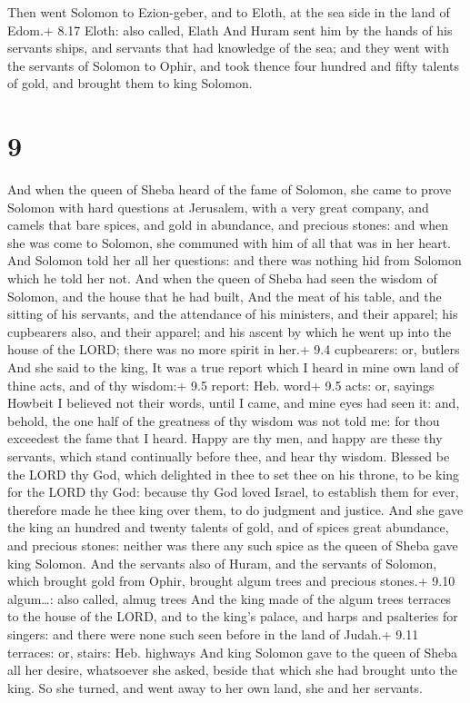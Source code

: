  Then went Solomon to Ezion-geber, and to Eloth, at the
sea side in the land of Edom.+ 8.17 Eloth: also called, Elath
 And Huram sent him by the hands of his servants ships, and
servants that had knowledge of the sea; and they went with the servants
of Solomon to Ophir, and took thence four hundred and fifty talents of
gold, and brought them to king Solomon.

\hypertarget{section-8}{%
\section{9}\label{section-8}}

 And when the queen of Sheba heard of the fame of Solomon,
she came to prove Solomon with hard questions at Jerusalem, with a very
great company, and camels that bare spices, and gold in abundance, and
precious stones: and when she was come to Solomon, she communed with him
of all that was in her heart.  And Solomon told her all her
questions: and there was nothing hid from Solomon which he told her not.
 And when the queen of Sheba had seen the wisdom of Solomon,
and the house that he had built,  And the meat of his table,
and the sitting of his servants, and the attendance of his ministers,
and their apparel; his cupbearers also, and their apparel; and his
ascent by which he went up into the house of the LORD; there was no more
spirit in her.+ 9.4 cupbearers: or, butlers  And she said to
the king, It was a true report which I heard in mine own land of thine
acts, and of thy wisdom:+ 9.5 report: Heb. word+ 9.5 acts: or, sayings
 Howbeit I believed not their words, until I came, and mine
eyes had seen it: and, behold, the one half of the greatness of thy
wisdom was not told me: for thou exceedest the fame that I heard.
 Happy are thy men, and happy are these thy servants, which
stand continually before thee, and hear thy wisdom.  Blessed
be the LORD thy God, which delighted in thee to set thee on his throne,
to be king for the LORD thy God: because thy God loved Israel, to
establish them for ever, therefore made he thee king over them, to do
judgment and justice.  And she gave the king an hundred and
twenty talents of gold, and of spices great abundance, and precious
stones: neither was there any such spice as the queen of Sheba gave king
Solomon.  And the servants also of Huram, and the servants
of Solomon, which brought gold from Ophir, brought algum trees and
precious stones.+ 9.10 algum\ldots: also called, almug trees
 And the king made of the algum trees terraces to the house
of the LORD, and to the king's palace, and harps and psalteries for
singers: and there were none such seen before in the land of Judah.+
9.11 terraces: or, stairs: Heb. highways  And king Solomon
gave to the queen of Sheba all her desire, whatsoever she asked, beside
that which she had brought unto the king. So she turned, and went away
to her own land, she and her servants.

